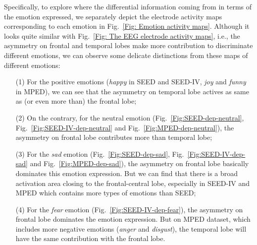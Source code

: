 \documentclass[journal]{IEEEtran}
\begin{document}
Specifically, to explore where the differential information coming from in terms of the emotion expressed, we separately depict the electrode activity maps corresponding to each emotion in Fig.~\ref{Fig: Emotion activity maps}. Although it looks quite similar with Fig.~\ref{Fig: The EEG electrode activity maps}, i.e., the asymmetry on frontal and temporal lobes make more contribution to discriminate different emotions, we can observe some delicate distinctions from these maps of different emotions:
\begin{itemize}
\item [(1)] For the positive emotions (\textit{happy} in SEED and SEED-IV, \textit{joy} and \textit{funny} in MPED), we can see that the asymmetry on temporal lobe actives as same as (or even more than) the frontal lobe; 
\item [(2)] On the contrary, for the neutral emotion (Fig.~\ref{Fig:SEED-dep-neutral}, Fig.~\ref{Fig:SEED-IV-dep-neutral} and Fig.~\ref{Fig:MPED-dep-neutral}), the asymmetry on frontal lobe contributes more than temporal lobe;
\item [(3)] For the \textit{sad} emotion (Fig.~\ref{Fig:SEED-dep-sad}, Fig.~\ref{Fig:SEED-IV-dep-sad} and Fig.~\ref{Fig:MPED-dep-sad}), the asymmetry on frontal lobe basically dominates this emotion expression. But we can find that there is a broad activation area closing to the frontal-central lobe, especially in SEED-IV and MPED which contains more types of emotions than SEED;
\item [(4)] For the \textit{fear} emotion (Fig.~\ref{Fig:SEED-IV-dep-fear}), the asymmetry on frontal lobe dominates the emotion expression. But on MPED dataset, which includes more negative emotions (\textit{anger} and \textit{disgust}), the temporal lobe will have the same contribution with the frontal lobe.
\end{itemize}
\end{document}
